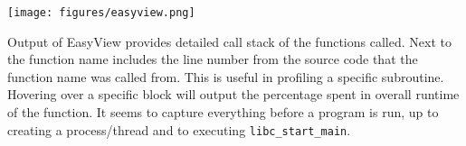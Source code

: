 \documentclass[11pt]{article}
\begin{document}
\centerline{\texttt{[image: figures/easyview.png]}}

Output of EasyView provides detailed call stack of the functions called. Next to the function name includes the line number from the source code that the function name was called from. This is useful in profiling a specific subroutine. Hovering over a specific block will output the percentage spent in overall runtime of the function. It seems to capture everything before a program is run, up to creating a process/thread and to executing \verb|libc_start_main|.
\end{document}
